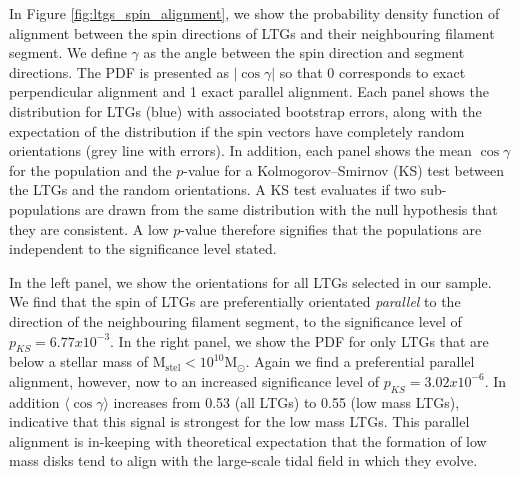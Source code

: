 In Figure \ref{fig:ltgs_spin_alignment}, we show the probability density function of alignment between the spin directions of LTGs and their neighbouring filament segment. We define $\gamma$ as the angle between the spin direction and segment directions. The PDF is presented as $|\cos \gamma|$ so that 0 corresponds to exact perpendicular alignment and 1 exact parallel alignment. Each panel shows the distribution for LTGs (blue) with associated bootstrap errors, along with the expectation of the distribution if the spin vectors have completely random orientations (grey line with errors). In addition, each panel shows the mean $\cos \gamma$ for the population and the $p$-value for a Kolmogorov--Smirnov (KS) test between the LTGs and the random orientations. A KS test evaluates if two sub-populations are drawn from the same distribution with the null hypothesis that they are consistent. A low $p$-value therefore signifies that the populations are independent to the significance level stated. 

In the left panel, we show the orientations for all LTGs selected in our sample. We find that the spin of LTGs are preferentially orientated \textit{parallel} to the direction of the neighbouring filament segment, to the significance level of $p_{KS} = 6.77 x 10^{-3}$. In the right panel, we show the PDF for only LTGs that are below a stellar mass of $\mathrm{M_{stel} < 10^{10} M_{\odot}}$. Again we find a preferential parallel alignment, however, now to an increased significance level of $p_{KS} = 3.02 x 10^{-6}$. In addition $\langle \cos \gamma \rangle$ increases from 0.53 (all LTGs) to 0.55 (low mass LTGs), indicative that this signal is strongest for the low mass LTGs. This parallel alignment is in-keeping with theoretical expectation that the formation of low mass disks tend to align with the large-scale tidal field in which they evolve. 

